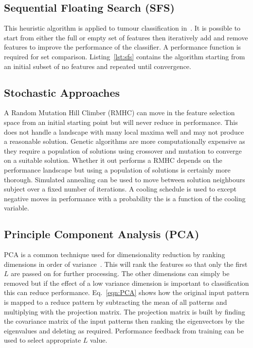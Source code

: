 \documentclass[journal]{IEEEtran}
\begin{document}
\subsection{Sequential Floating Search (SFS)}

This heuristic algorithm is applied to tumour classification in~\cite{hau07feat}.
It is possible to start from either the full or empty set of features then iteratively add and remove features to improve the performance of the classifier. 
A performance function is required for set comparison. 
Listing~\ref{lst:sfs} contains the algorithm starting from an initial subset of no features and repeated until convergence.





\subsection{Stochastic Approaches}
A Random Mutation Hill Climber (RMHC) can move in the feature selection space from an initial starting point but will never reduce in performance.  
This does not handle a landscape with many local maxima well and may not produce a reasonable solution.
Genetic algorithms are more computationally expensive as they require a population of solutions using crossover and mutation to converge on a suitable solution.   
Whether it out performs a RMHC depends on the performance landscape but using a population of solutions is certainly more thorough.    
Simulated annealing can be used to move between solution neighbours subject over a fixed number of iterations.
A cooling schedule is used to except negative moves in performance with a probability the is a function of the cooling variable. 


\subsection{Principle Component Analysis (PCA)}
PCA is a common technique used for dimensionality reduction by ranking dimensions in order of variance~\cite{pearson01pca}.
This will rank the features so that only the first $L$ are passed on for further processing. 
The other dimensions can simply be removed but if the effect of a low variance dimension is important to classification this can reduce performance.
Eq.~\eqref{eqn:PCA} shows how the original input pattern is mapped to a reduce pattern by subtracting the mean of all patterns and multiplying with the projection matrix.
The projection matrix is built by finding the covariance matrix of the input patterns then ranking the eigenvectors by the eigenvalues and deleting as required.
Performance feedback from training can be used to select appropriate $L$ value.
\end{document}
